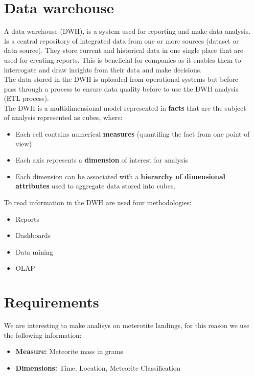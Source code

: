 \documentclass[conference]{IEEEtran}
\begin{document}
	\section{Data warehouse}
	A data warehouse (DWH), is a system used for reporting and make data analysis. Is a central repository of integrated data from one or more sources (dataset or data source). They store current and historical data in one single place that are used for creating reports. This is beneficial for companies as it enables them to interrogate and draw insights from their data and make decisions.\\ The data stored in the DWH is uploaded from operational systems but before pass through a process to ensure data quality before to use the DWH analysis (ETL process).\\ The DWH is a multidimensional model represented in \textbf{facts} that are the subject of analysis represented as cubes, where:
	\begin{itemize}
		\item Each cell contains numerical \textbf{measures} (quantifing the fact from one point of view)
		\item Each axis represents a \textbf{dimension} of interest for analysis
		\item Each dimension can be associated with a \textbf{hierarchy of dimensional attributes} used to aggregate data stored into cubes.
	\end{itemize}
	To read information in the DWH are used four methodologies:
	\begin{itemize}
		\item Reports
		\item Dashboards
		\item Data mining
		\item OLAP
	\end{itemize}
	 
	\section{Requirements}
	We are interesting to make analisys on meterotite landings, for this reason we use the following information:
	\begin{itemize}
		\item \textbf{Measure:} Meteorite mass in grams 
		\item \textbf{Dimensions:} Time, Location, Meteorite Classification
	\end{itemize}
	
\end{document}
